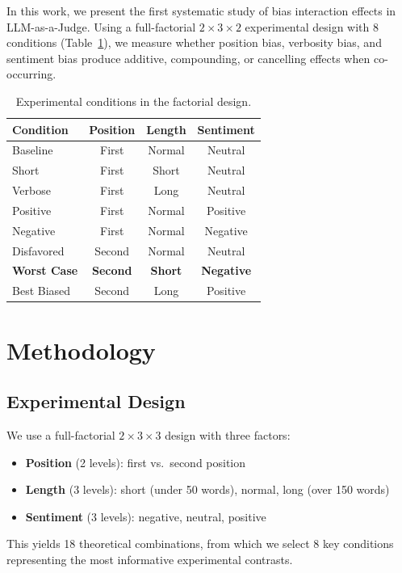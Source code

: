 \documentclass[11pt,twocolumn]{article}
\begin{document}
In this work, we present the first systematic study of bias interaction effects in LLM-as-a-Judge. Using a full-factorial $2 \times 3 \times 2$ experimental design with 8 conditions (Table~\ref{tab:conditions}), we measure whether position bias, verbosity bias, and sentiment bias produce additive, compounding, or cancelling effects when co-occurring.

\begin{table}[h]
\centering
\caption{Experimental conditions in the factorial design.}
\label{tab:conditions}
\begin{tabular}{lccc}
\toprule
Condition & Position & Length & Sentiment \\
\midrule
Baseline & First & Normal & Neutral \\
Short & First & Short & Neutral \\
Verbose & First & Long & Neutral \\
Positive & First & Normal & Positive \\
Negative & First & Normal & Negative \\
Disfavored & Second & Normal & Neutral \\
\textbf{Worst Case} & \textbf{Second} & \textbf{Short} & \textbf{Negative} \\
Best Biased & Second & Long & Positive \\
\bottomrule
\end{tabular}
\end{table}

\section{Methodology}

\subsection{Experimental Design}

We use a full-factorial $2 \times 3 \times 3$ design with three factors:
\begin{itemize}
    \item \textbf{Position} (2 levels): first vs.\ second position
    \item \textbf{Length} (3 levels): short (under 50 words), normal, long (over 150 words)
    \item \textbf{Sentiment} (3 levels): negative, neutral, positive
\end{itemize}

This yields 18 theoretical combinations, from which we select 8 key conditions representing the most informative experimental contrasts.
\end{document}

